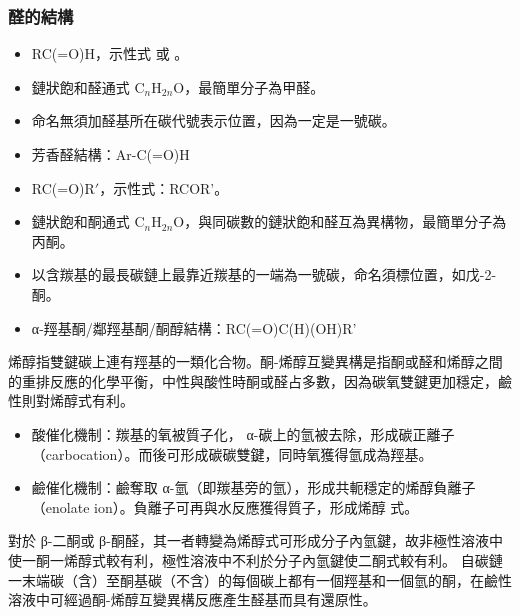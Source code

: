 \documentclass[a4paper,12pt]{report}
\begin{document}
\begin{itemize}
\subsubsection{醛的結構}
\begin{itemize}
\item RC(=O)H，示性式  或 。
\item 鏈狀飽和醛通式 C$_n$H$_{2n}$O，最簡單分子為甲醛。
\item 命名無須加醛基所在碳代號表示位置，因為一定是一號碳。
\item 芳香醛結構：Ar-C(=O)H
\end{itemize}
\begin{itemize}
\item RC(=O)R$'$，示性式：RCOR'。
\item 鏈狀飽和酮通式 C$_n$H$_{2n}$O，與同碳數的鏈狀飽和醛互為異構物，最簡單分子為丙酮。
\item 以含羰基的最長碳鏈上最靠近羰基的一端為一號碳，命名須標位置，如戊-2-酮。
\item α-羥基酮/鄰羥基酮/酮醇結構：RC(=O)C(H)(OH)R'
\end{itemize}
烯醇指雙鍵碳上連有羥基的一類化合物。酮-烯醇互變異構是指酮或醛和烯醇之間的重排反應的化學平衡，中性與酸性時酮或醛占多數，因為碳氧雙鍵更加穩定，鹼性則對烯醇式有利。
\begin{itemize}
\item 酸催化機制：羰基的氧被質子化， α-碳上的氫被去除，形成碳正離子（carbocation）。而後可形成碳碳雙鍵，同時氧獲得氫成為羥基。
\item 鹼催化機制：鹼奪取 α-氫（即羰基旁的氫），形成共軛穩定的烯醇負離子（enolate ion）。負離子可再與水反應獲得質子，形成烯醇 式。
\end{itemize}
對於 β-二酮或 β-酮醛，其一者轉變為烯醇式可形成分子內氫鍵，故非極性溶液中使一酮一烯醇式較有利，極性溶液中不利於分子內氫鍵使二酮式較有利。
自碳鏈一末端碳（含）至酮基碳（不含）的每個碳上都有一個羥基和一個氫的酮，在鹼性溶液中可經過酮-烯醇互變異構反應產生醛基而具有還原性。

\end{itemize}
\end{document}
